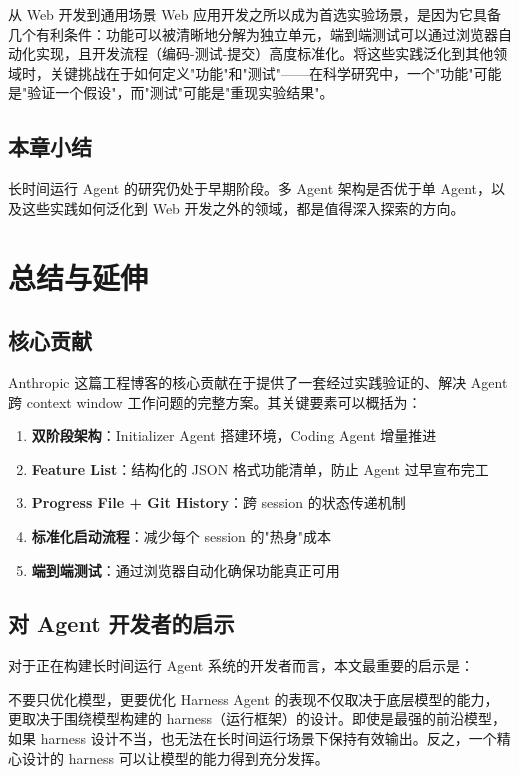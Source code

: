 \documentclass[a4paper]{article}
\begin{document}
\begin{knowledgebox}{从 Web 开发到通用场景}
Web 应用开发之所以成为首选实验场景，是因为它具备几个有利条件：功能可以被清晰地分解为独立单元，端到端测试可以通过浏览器自动化实现，且开发流程（编码-测试-提交）高度标准化。将这些实践泛化到其他领域时，关键挑战在于如何定义"功能"和"测试"——在科学研究中，一个"功能"可能是"验证一个假设"，而"测试"可能是"重现实验结果"。
\end{knowledgebox}

\subsection{本章小结}

长时间运行 Agent 的研究仍处于早期阶段。多 Agent 架构是否优于单 Agent，以及这些实践如何泛化到 Web 开发之外的领域，都是值得深入探索的方向。


\section{总结与延伸}

\subsection{核心贡献}

Anthropic 这篇工程博客的核心贡献在于提供了一套经过实践验证的、解决 Agent 跨 context window 工作问题的完整方案。其关键要素可以概括为：

\begin{enumerate}
    \item \textbf{双阶段架构}：Initializer Agent 搭建环境，Coding Agent 增量推进
    \item \textbf{Feature List}：结构化的 JSON 格式功能清单，防止 Agent 过早宣布完工
    \item \textbf{Progress File + Git History}：跨 session 的状态传递机制
    \item \textbf{标准化启动流程}：减少每个 session 的"热身"成本
    \item \textbf{端到端测试}：通过浏览器自动化确保功能真正可用
\end{enumerate}

\subsection{对 Agent 开发者的启示}

对于正在构建长时间运行 Agent 系统的开发者而言，本文最重要的启示是：

\begin{importantbox}{不要只优化模型，更要优化 Harness}
Agent 的表现不仅取决于底层模型的能力，更取决于围绕模型构建的 harness（运行框架）的设计。即使是最强的前沿模型，如果 harness 设计不当，也无法在长时间运行场景下保持有效输出。反之，一个精心设计的 harness 可以让模型的能力得到充分发挥。
\end{importantbox}
\end{document}
